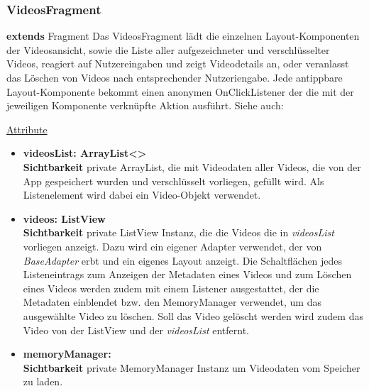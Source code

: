 \subsubsection{VideosFragment} \label{app:klasse:VideosFragment}
\textbf{extends} Fragment \newline
Das VideosFragment lädt die einzelnen Layout-Komponenten der Videosansicht, sowie die Liste aller aufgezeichneter und verschlüsselter Videos, reagiert auf Nutzereingaben und zeigt Videodetails an, oder veranlasst das Löschen von Videos nach entsprechender Nutzeriengabe. Jede antippbare Layout-Komponente bekommt einen anonymen OnClickListener der die mit der jeweiligen Komponente verknüpfte Aktion ausführt.
\newline
Siehe auch:  \newline

\underline{Attribute}
\begin{itemize}
\itemsep0pt
\item \textbf{videosList: ArrayList<> } \hfill\\ 
\textbf{Sichtbarkeit} private \newline
ArrayList, die mit Videodaten aller Videos, die von der App gespeichert wurden und verschlüsselt vorliegen, gefüllt wird. Als Listenelement wird dabei ein Video-Objekt verwendet.

\item \textbf{videos: ListView} \hfill\\ 
\textbf{Sichtbarkeit} private \newline
ListView Instanz, die die Videos die in \textit{videosList} vorliegen anzeigt. Dazu wird ein eigener Adapter verwendet, der von \textit{BaseAdapter} erbt und ein eigenes Layout anzeigt. Die Schaltflächen jedes Listeneintrags zum Anzeigen der Metadaten eines Videos und zum Löschen eines Videos werden zudem mit einem Listener ausgestattet, der die Metadaten einblendet bzw. den MemoryManager verwendet, um das ausgewählte Video zu löschen. Soll das Video gelöscht werden wird zudem das Video von der ListView und der \textit{videosList} entfernt.

\item \textbf{memoryManager: } \hfill\\ 
\textbf{Sichtbarkeit} private \newline
MemoryManager Instanz um Videodaten vom Speicher zu laden.

\end{itemize}

